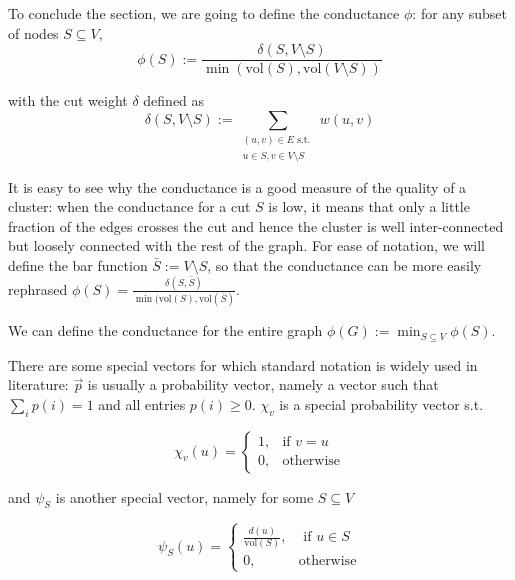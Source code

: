 \documentclass[../main.tex]{subfiles}
\begin{document}
    To conclude the section, we are going to define the conductance $\phi$: for any subset of nodes $S\subseteq V$,
    \begin{equation}
        \phi(S) := \frac{\delta(S, V\setminus S)}{\min(\text{vol}(S), \text{vol}(V\setminus S))}
    \end{equation}
    
    with the cut weight $\delta$ defined as
    \begin{equation}
        \delta(S, V\setminus S) := \sum_{\substack{(u,v)\in E \text{ s.t. }\\ u\in S, v\in V\setminus S}} w(u,v)
    \end{equation}
    
    It is easy to see why the conductance is a good measure of the quality of a cluster: when the conductance for a cut $S$ is low, it means that only a little fraction of the edges crosses the cut and hence the cluster is well inter-connected but loosely connected with the rest of the graph. For ease of notation, we will define the bar function $\bar{S} := V\setminus S$, so that the conductance can be more easily rephrased $\phi(S) = \frac{\delta(S,\bar{S})}{\min(\text{vol}(S), \text{vol}(\bar{S})}$.
    
    We can define the conductance for the entire graph $\phi(G) := \min_{S\subseteq V} \phi(S)$.
    
    There are some special vectors for which standard notation is widely used in literature: $\vec{p}$ is usually a probability vector, namely a vector such that $\sum_i p(i) = 1$ and all entries $p(i) \geq 0$. $\chi_v$ is a special probability vector s.t.
    
    \begin{equation}
        \chi_v(u) = \begin{cases}
            1,& \text{if } v=u\\
            0,& \text{otherwise}
        \end{cases}
    \end{equation}
    
    and $\psi_S$ is another special vector, namely for some $S\subseteq V$
    
    \begin{equation}
        \psi_S(u) = \begin{cases}
            \frac{d(u)}{\text{vol}(S)}, & \text{ if } u\in S \\
            0, & \text{otherwise}
        \end{cases}
    \end{equation}
    
\end{document}
